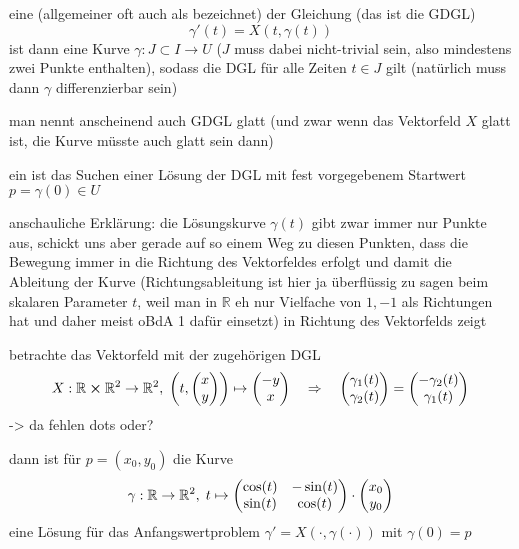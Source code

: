 \documentclass[../H_Analysis_main.tex]{subfiles}
\begin{document}
eine  (allgemeiner oft auch als  bezeichnet) der Gleichung (das ist die GDGL)
\begin{equation}
\gamma'(t) = X(t, \gamma(t))
\end{equation}
ist dann eine Kurve $\gamma: J \subset I \rightarrow U$ ($J$ muss dabei nicht-trivial sein, also mindestens zwei Punkte enthalten), sodass die DGL für alle Zeiten $t \in J$ gilt (natürlich muss dann $\gamma$ differenzierbar sein)

man nennt anscheinend auch GDGL glatt (und zwar wenn das Vektorfeld $X$ glatt ist, die Kurve müsste auch glatt sein dann)

ein  ist das Suchen einer Lösung der DGL mit fest vorgegebenem Startwert $p = \gamma(0) \in U$


anschauliche Erklärung: die Lösungskurve $\gamma(t)$ gibt zwar immer nur Punkte aus, schickt uns aber gerade auf so einem Weg zu diesen Punkten, dass die Bewegung immer in die Richtung des Vektorfeldes erfolgt und damit die Ableitung der Kurve (Richtungsableitung ist hier ja überflüssig zu sagen beim skalaren Parameter $t$, weil man in $\mathbb{R}$ eh nur Vielfache von $1, -1$ als Richtungen hat und daher meist oBdA 1 dafür einsetzt) in Richtung des Vektorfelds zeigt


\begin{bsp}
betrachte das Vektorfeld mit der zugehörigen DGL
\begin{equation}
X: \mathbb{R} \cross \mathbb{R}^2 \rightarrow \mathbb{R}^2, \; \qty(t, \mqty(x \\ y)) \mapsto \mqty(-y \\ x) \quad \Rightarrow \quad \mqty(\gamma_1(t) \\ \gamma_2(t)) = \mqty(- \gamma_2(t) \\ \gamma_1(t))
\end{equation}
-> da fehlen dots oder?

dann ist für $p = (x_0, y_0)$ die Kurve
\begin{equation}
\gamma: \mathbb{R} \rightarrow \mathbb{R}^2, \; t \mapsto \mqty(\cos(t) & -\sin(t) \\ \sin(t) & \cos(t)) \cdot \mqty(x_0 \\ y_0)
\end{equation}
eine Lösung für das Anfangswertproblem $\gamma' = X(\cdot, \gamma(\cdot))$ mit $\gamma(0) = p$
\end{bsp}
\end{document}
